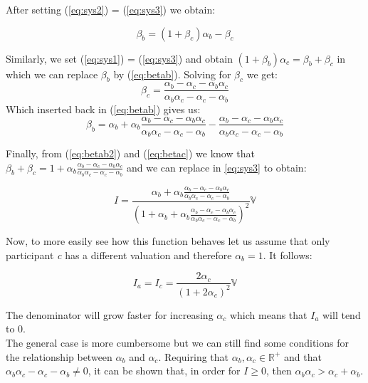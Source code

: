 \begin{appendices}
After setting (\ref{eq:sys2}) = (\ref{eq:sys3}) we obtain:

\begin{equation}
    \label{eq:betab}\beta_b=(1+\beta_c)\alpha_b-\beta_c
\end{equation}

Similarly, we set (\ref{eq:sys1}) = (\ref{eq:sys3}) and obtain $(1+\beta_b)\alpha_c=\beta_b+\beta_c$ in which we can replace $\beta_b$ by (\ref{eq:betab}). Solving for $\beta_c$ we get:
\begin{equation}
\label{eq:betac}
    \beta_c = \frac{\alpha_b-\alpha_c-\alpha_b\alpha_c}{\alpha_b\alpha_c-\alpha_c-\alpha_b}
\end{equation}
Which inserted back in (\ref{eq:betab}) gives us:
\begin{equation}
\label{eq:betab2}
    \beta_b=\alpha_b + \alpha_b\frac{\alpha_b-\alpha_c-\alpha_b\alpha_c}{\alpha_b\alpha_c-\alpha_c-\alpha_b}-\frac{\alpha_b-\alpha_c-\alpha_b\alpha_c}{\alpha_b\alpha_c-\alpha_c-\alpha_b}
\end{equation}

Finally, from (\ref{eq:betab2}) and (\ref{eq:betac}) we know that $\beta_b+\beta_c = 1+\alpha_b\frac{\alpha_b-\alpha_c-\alpha_b\alpha_c}{\alpha_b\alpha_c-\alpha_c-\alpha_b}$ and we can replace in \ref{eq:sys3} to obtain:

\begin{equation}
\label{eq:InvDiffVal}
    I = \frac{\alpha_b+\alpha_b\frac{\alpha_b-\alpha_c-\alpha_b\alpha_c}{\alpha_b\alpha_c-\alpha_c-\alpha_b}}{(1+\alpha_b
    +\alpha_b\frac{\alpha_b-\alpha_c-\alpha_b\alpha_c}{\alpha_b\alpha_c-\alpha_c-\alpha_b})^2}\mathbb{V}
\end{equation}

\hfill \break

Now, to more easily see how this function behaves let us assume that only participant \textit{c} has a different valuation and therefore $\alpha_b = 1$. It follows:

\begin{equation}
    I_a=I_c=\frac{2\alpha_c}{(1+2\alpha_c)^2}\mathbb{V}
\end{equation}

The denominator will grow faster for increasing $\alpha_c$ which means that $I_a$ will tend to $0$.\\


The general case is more cumbersome but we can still find some conditions for the relationship between $\alpha_b$ and $\alpha_c$. Requiring that $\alpha_b, \alpha_c \in \mathbb{R}^+$ and that $\alpha_b\alpha_c-\alpha_c-\alpha_b \neq 0$, it can be shown that, in order for $I\geq0$, then $\alpha_b\alpha_c>\alpha_c+\alpha_b$.\\


\end{appendices}
